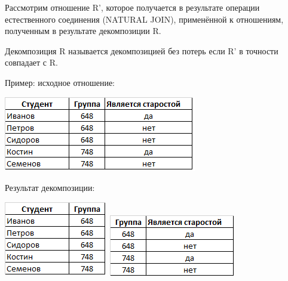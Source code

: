 \documentclass{beamer}
\begin{document}
\begin{frame}
Рассмотрим отношение R', которое получается в результате операции естественного соединения (NATURAL JOIN), применённой к отношениям, полученным в результате декомпозиции R.
\begin{block}{Декомпозиция R называется декомпозицией без потерь}
если R' в точности совпадает с R. 
\end{block}
Пример: исходное отношение:
\begin{center}
\includegraphics[scale=0.5]{images/ex-rasp-14.png}
\end{center}
Результат декомпозиции:
\begin{center}
\includegraphics[scale=0.5]{images/ex-rasp-15.png}
\includegraphics[scale=0.5]{images/ex-rasp-16.png}
\end{center}
\end{frame}
\end{document}
